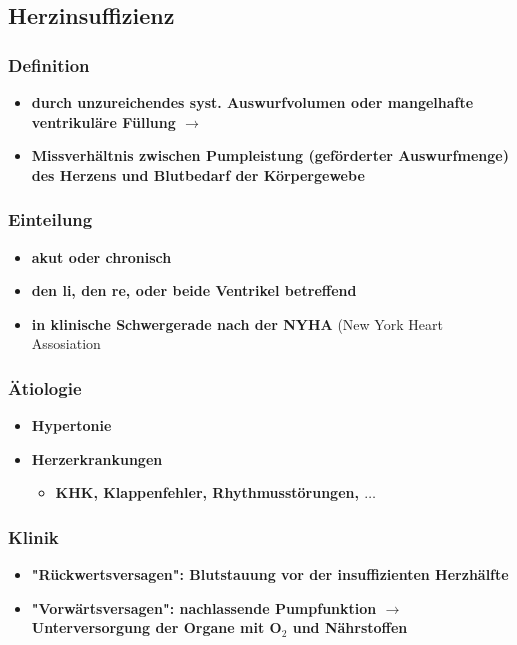 	\subsection{Herzinsuffizienz}
		\subsubsection{Definition}
			\begin{itemize}
				\item \textbf{durch unzureichendes syst. Auswurfvolumen oder mangelhafte ventrikuläre Füllung $\rightarrow$}
				\item \textbf{Missverhältnis zwischen Pumpleistung (geförderter Auswurfmenge) des Herzens und Blutbedarf der Körpergewebe}
			\end{itemize}
		\subsubsection{Einteilung}
			\begin{itemize}
				\item \textbf{akut oder chronisch}
				\item \textbf{den li, den re, oder beide Ventrikel betreffend}
				\item \textbf{in klinische Schwergerade nach der NYHA} (New York Heart Assosiation
			\end{itemize}
		\subsubsection{Ätiologie}
			\begin{itemize}
				\item \textbf{Hypertonie}
				\item \textbf{Herzerkrankungen}
					\begin{itemize}
						\item \textbf{KHK, Klappenfehler, Rhythmusstörungen, $\dots$}
					\end{itemize}
			\end{itemize}
		\subsubsection{Klinik}
			\begin{itemize}
				\item \textbf{"Rückwertsversagen": Blutstauung vor der insuffizienten Herzhälfte}
				\item \textbf{"Vorwärtsversagen": nachlassende Pumpfunktion $\rightarrow$ Unterversorgung der Organe mit O$_2$ und Nährstoffen}
			\end{itemize}
